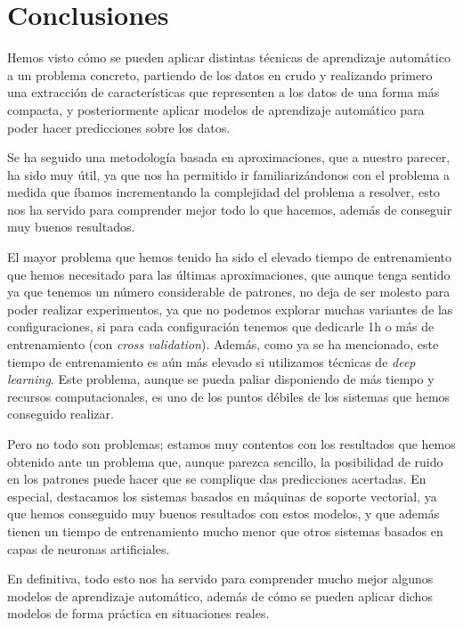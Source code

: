 \documentclass[12pt]{article}
\begin{document}
\newpage
\section{Conclusiones}
\label{Conclusiones}

Hemos visto cómo se pueden aplicar distintas técnicas de aprendizaje automático a un problema concreto,
partiendo de los datos en crudo y realizando primero una extracción de características que representen a los
datos de una forma más compacta, y posteriormente aplicar modelos de aprendizaje automático para poder
hacer predicciones sobre los datos.

\bigskip
Se ha seguido una metodología basada en aproximaciones, que a nuestro parecer, ha sido muy útil, ya que nos
ha permitido ir familiarizándonos con el problema a medida que íbamos incrementando la complejidad del problema a resolver,
esto nos ha servido para comprender mejor todo lo que hacemos, además de conseguir muy buenos resultados.

\bigskip
El mayor problema que hemos tenido ha sido el elevado tiempo de entrenamiento que hemos necesitado para las últimas aproximaciones,
que aunque tenga sentido ya que tenemos un número considerable de patrones, no deja de ser molesto para poder 
realizar experimentos, ya que no podemos explorar muchas variantes de las configuraciones, si para cada configuración
tenemos que dedicarle 1h o más de entrenamiento (con \textit{cross validation}). Además, como ya se ha mencionado,
este tiempo de entrenamiento es aún más elevado si utilizamos técnicas de \textit{deep learning}.
Este problema, aunque se pueda paliar disponiendo de más tiempo y recursos computacionales, es uno de los puntos
débiles de los sistemas que hemos conseguido realizar.

\bigskip
Pero no todo son problemas; estamos muy contentos con los resultados que hemos obtenido ante un problema que,
aunque parezca sencillo, la posibilidad de ruido en los patrones puede hacer que se complique das predicciones acertadas.
En especial, destacamos los sistemas basados en máquinas de soporte vectorial, ya que hemos conseguido muy buenos resultados
con estos modelos, y que además tienen un tiempo de entrenamiento mucho menor que otros sistemas basados en capas de
neuronas artificiales.

\bigskip
En definitiva, todo esto nos ha servido para comprender mucho mejor algunos modelos de aprendizaje automático,
además de cómo se pueden aplicar dichos modelos de forma práctica en situaciones reales.
\end{document}
